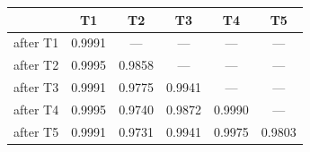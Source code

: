 \begin{tabular}{@{}lccccc@{}}
\toprule
& \textbf{T1} & \textbf{T2} & \textbf{T3} & \textbf{T4} & \textbf{T5} \\
\midrule
after T1 & 0.9991 & --- & --- & --- & --- \\
after T2 & 0.9995 & 0.9858 & --- & --- & --- \\
after T3 & 0.9991 & 0.9775 & 0.9941 & --- & --- \\
after T4 & 0.9995 & 0.9740 & 0.9872 & 0.9990 & --- \\
after T5 & 0.9991 & 0.9731 & 0.9941 & 0.9975 & 0.9803 \\
\bottomrule
\end{tabular}
